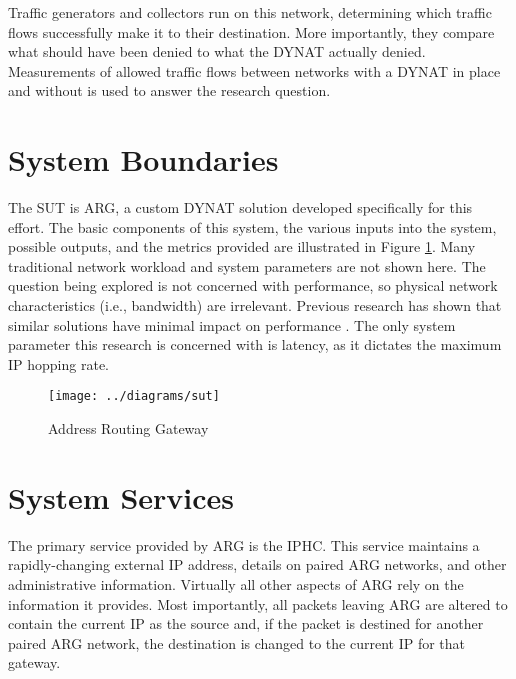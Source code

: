 \par Traffic generators and collectors run on this network, determining which traffic flows successfully make it to their destination. More importantly, they compare what should have been denied to what the \ac{DYNAT} actually denied. Measurements of allowed traffic flows between networks with a \ac{DYNAT} in place and without is used to answer the research question.


\FloatBarrier
\section{System Boundaries}
\label{sec:boundaries}
\par The \ac{SUT} is \ac{ARG}, a custom \ac{DYNAT} solution developed specifically for this effort. The basic components of this system, the various inputs into the system, possible outputs, and the metrics provided are illustrated in Figure \ref{fig:sut}. Many traditional network workload and system parameters are not shown here. The question being explored is not concerned with performance, so physical network characteristics (i.e., bandwidth) are irrelevant. Previous research has shown that similar solutions have minimal impact on performance \cite{NAH}. The only system parameter this research is concerned with is latency, as it dictates the maximum \ac{IP} hopping rate.

\begin{figure}
	\centering
	\texttt{[image: ../diagrams/sut]}
	\caption{Address Routing Gateway}
	\label{fig:sut}
\end{figure}

\FloatBarrier
\section{System Services}
\label{sec:services}
\par The primary service provided by \ac{ARG} is the \ac{IPHC}. This service maintains a rapidly-changing external \ac{IP} address, details on paired \ac{ARG} networks, and other administrative information. Virtually all other aspects of \ac{ARG} rely on the information it provides. Most importantly, all packets leaving \ac{ARG} are altered to contain the current \ac{IP} as the source and, if the packet is destined for another paired \ac{ARG} network, the destination is changed to the current \ac{IP} for that gateway.

